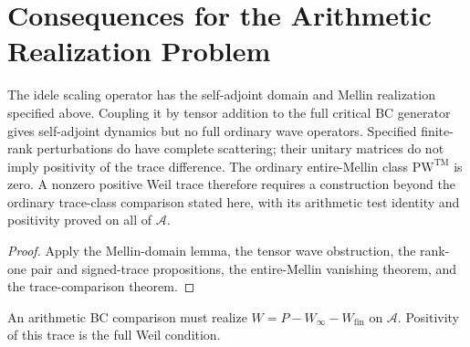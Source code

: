 \section{Consequences for the Arithmetic Realization Problem}
\label{v4-arith:w7-j:form}

\begin{theorem}
\label{v4-arith:w7-j:thm:summary}
The idele scaling operator has the self-adjoint domain and Mellin
realization specified above. Coupling it by tensor addition to the
full critical BC generator gives self-adjoint dynamics but no full
ordinary wave operators. Specified finite-rank perturbations do
have complete scattering; their unitary matrices do not imply
positivity of the trace difference. The ordinary entire-Mellin
class \(\mathrm{PW}^{\mathrm{TM}}\) is zero. A nonzero positive
Weil trace therefore requires a construction beyond the ordinary
trace-class comparison stated here, with its arithmetic test
identity and positivity proved on all of \(\mathscr A\).
\end{theorem}
\begin{proof}
Apply the Mellin-domain lemma, the tensor wave obstruction, the
rank-one pair and signed-trace propositions, the entire-Mellin
vanishing theorem, and the trace-comparison theorem.
\end{proof}

\begin{remark}
\label{v4-arith:w7-j:rem:beilinson}
An arithmetic BC comparison must realize
\(W=P-W_\infty-W_{\mathrm{fin}}\) on \(\mathscr A\).
Positivity of this trace is the full Weil condition.
\end{remark}
